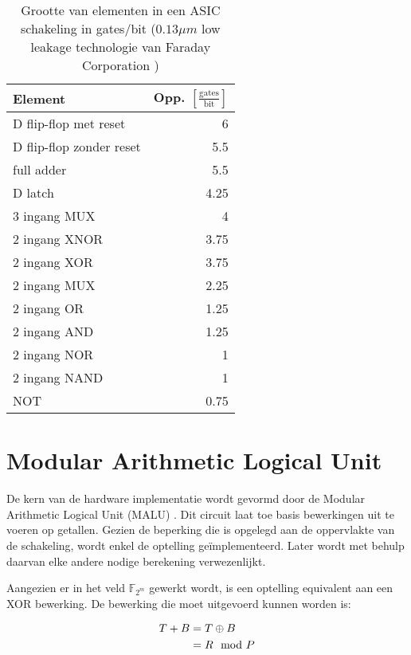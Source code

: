 \begin{table}[h]
	\caption[Oppervlakte van elementen in een ASIC schakeling in gates$/$bit ($0.13 \mu m$ \emph{low leakage} technologie van Faraday Technology Corporation)]{Grootte van elementen in een ASIC schakeling in gates$/$bit ($0.13 \mu m$ low leakage technologie van Faraday Corporation \cite{cell-databook})}
	\label{tabel-implementatie-beperkingen-elementen-gatecount}

	\centering
	\begin{tabular}{lr}
		\toprule
		Element			& Opp. $\left[\frac{\text{gates}}{\text{bit}}\right]$\\
		\midrule
		D flip-flop met reset	& 6\\
		D flip-flop zonder reset	& 5.5\\
		full adder		& 5.5\\
		D latch			& 4.25\\
		3 ingang MUX	& 4\\
		2 ingang XNOR	& 3.75\\
		2 ingang XOR	& 3.75\\
		2 ingang MUX	& 2.25\\
		2 ingang OR		& 1.25\\
		2 ingang AND	& 1.25\\
		2 ingang NOR	& 1\\
		2 ingang NAND	& 1\\
		NOT				& 0.75\\
		\bottomrule		
	\end{tabular}
\end{table}

\section{Modular Arithmetic Logical Unit\label{sectie-implementatie-malu}}

De kern van de hardware implementatie wordt gevormd door de Modular Arithmetic Logical Unit (MALU) \cite{sakiyama, batina-lowcost}. Dit circuit laat toe basis bewerkingen uit te voeren op getallen. Gezien de beperking die is opgelegd aan de oppervlakte van de schakeling, wordt enkel de optelling ge\"implementeerd. Later wordt met behulp daarvan elke andere nodige berekening verwezenlijkt.

Aangezien er in het veld $\mathbb{F}_{2^m}$ gewerkt wordt, is een optelling equivalent aan een XOR bewerking. De bewerking die moet uitgevoerd kunnen worden is:

\[\begin{aligned}
T + B	&= T \oplus B\\
		&= R \mod P
\end{aligned}\]

